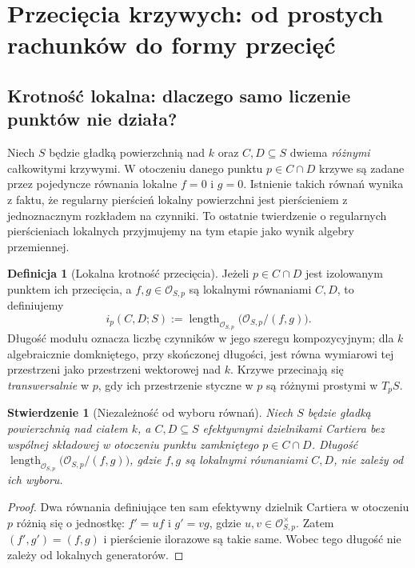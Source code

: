 \documentclass[11pt,a4paper,openany]{report}
\numberwithin{equation}{section}
\theoremstyle{plain}
\newtheorem{stwierdzenie}[twierdzenie]{Stwierdzenie}
\theoremstyle{definition}
\newtheorem{definicja}[twierdzenie]{Definicja}
\theoremstyle{remark}
\begin{document}
\section{Przecięcia krzywych: od prostych rachunków do formy przecięć}
\label{sec:ga6-intersections}

\subsection{Krotność lokalna: dlaczego samo liczenie punktów nie działa?}

Niech $S$ będzie gładką powierzchnią nad $k$ oraz $C,D\subseteq S$
dwiema \emph{różnymi} całkowitymi krzywymi. W otoczeniu danego
punktu $p\in C\cap D$ krzywe są zadane przez pojedyncze równania
lokalne $f=0$ i $g=0$. Istnienie takich równań wynika z faktu,
że regularny pierścień lokalny powierzchni jest pierścieniem
z jednoznacznym rozkładem na czynniki. To ostatnie twierdzenie
o regularnych pierścieniach lokalnych przyjmujemy na tym etapie
jako wynik algebry przemiennej.

\begin{definicja}[Lokalna krotność przecięcia]
\label{def:ga6-intersection-local}
Jeżeli $p\in C\cap D$ jest izolowanym punktem ich przecięcia,
a $f,g\in\mathcal O_{S,p}$ są lokalnymi równaniami $C,D$,
to definiujemy
\[
 i_p(C,D;S):=\operatorname{length}_{\mathcal O_{S,p}}
   \bigl(\mathcal O_{S,p}/(f,g)\bigr).
\]
Długość modułu oznacza liczbę czynników w jego szeregu
kompozycyjnym; dla $k$ algebraicznie domkniętego, przy
skończonej długości, jest równa wymiarowi tej przestrzeni
jako przestrzeni wektorowej nad $k$. Krzywe przecinają się
\emph{transwersalnie} w $p$, gdy ich przestrzenie styczne w $p$
są różnymi prostymi w $T_pS$.
\end{definicja}

\begin{stwierdzenie}[Niezależność od wyboru równań]
\label{st:ga6-independent-local}
Niech $S$ będzie gładką powierzchnią nad ciałem $k$,
a $C,D\subseteq S$ efektywnymi dzielnikami Cartiera
bez wspólnej składowej w otoczeniu punktu zamkniętego
$p\in C\cap D$. Długość
$\operatorname{length}_{\mathcal O_{S,p}}
\bigl(\mathcal O_{S,p}/(f,g)\bigr)$, gdzie $f,g$
są lokalnymi równaniami $C,D$, nie zależy od ich wyboru.
\end{stwierdzenie}
\begin{proof}
Dwa równania definiujące ten sam efektywny dzielnik
Cartiera w otoczeniu $p$ różnią się o jednostkę:
$f'=uf$ i $g'=vg$, gdzie $u,v\in\mathcal O_{S,p}^{\times}$.
Zatem $(f',g')=(f,g)$ i pierścienie ilorazowe są takie same.
Wobec tego długość nie zależy od lokalnych generatorów.
\end{proof}
\end{document}
